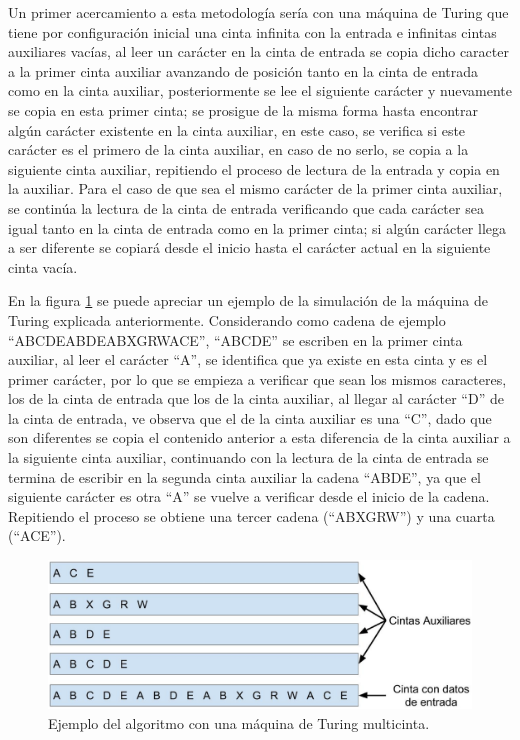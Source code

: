 Un primer acercamiento a esta metodolog\'ia ser\'ia con una m\'aquina de 
 Turing que tiene por configuraci\'on inicial una cinta infinita
 con la entrada e infinitas cintas auxiliares vac\'ias, al leer
 un car\'acter en la cinta de entrada se copia dicho caracter a la primer 
 cinta auxiliar avanzando de posici\'on tanto en la cinta de entrada como 
 en la cinta auxiliar, posteriormente se lee el siguiente car\'acter y 
 nuevamente se copia en esta primer cinta; se prosigue de la misma forma 
 hasta encontrar alg\'un car\'acter existente en la cinta auxiliar, en 
 este caso, se verifica si este car\'acter es el primero de la cinta
 auxiliar, en caso de no serlo, se copia a la siguiente cinta auxiliar, 
 repitiendo el proceso de lectura de la entrada y copia en la auxiliar. 
 Para el caso de que sea el mismo car\'acter de la primer cinta auxiliar, 
 se contin\'ua la lectura de la cinta de entrada verificando que cada car\'acter 
 sea igual tanto en la cinta de entrada como en la primer cinta; si alg\'un 
 car\'acter llega a ser diferente se copiar\'a desde el inicio hasta el 
 car\'acter actual en la siguiente cinta vac\'ia.

  
En la figura \ref{fig:alg01} se puede apreciar un ejemplo de la simulaci\'on de 
 la m\'aquina de Turing explicada anteriormente. Considerando como cadena de 
 ejemplo ``ABCDEABDEABXGRWACE'', ``ABCDE'' se escriben en la primer cinta 
 auxiliar, al leer el car\'acter ``A'', se identifica que ya existe en esta 
 cinta y es el primer car\'acter, por lo que se empieza a verificar que sean
 los mismos caracteres, los de la cinta de entrada que los de la cinta 
 auxiliar, al llegar al car\'acter ``D'' de la cinta de entrada, ve observa 
 que el de la cinta auxiliar es una ``C'', dado que son diferentes se copia 
 el contenido anterior a esta diferencia de la cinta auxiliar a la siguiente 
 cinta auxiliar, continuando con la lectura de la cinta de entrada se termina 
 de escribir en la segunda cinta auxiliar la cadena ``ABDE'', ya que el 
 siguiente car\'acter es otra ``A'' se vuelve a verificar desde el inicio de 
 la cadena. Repitiendo el proceso se obtiene una tercer cadena (``ABXGRW'') 
 y una cuarta (``ACE'').
  
\begin{figure}[h]
\centering
\includegraphics[width=1.0\columnwidth]{chap4/Imagenes/algoritmo1.eps}
\caption{Ejemplo del algoritmo con una m\'aquina de Turing multicinta.}
\label{fig:alg01}
\end{figure}
 